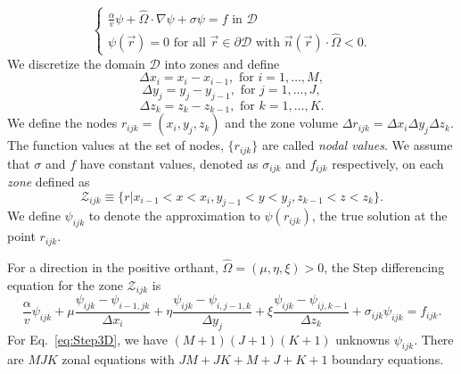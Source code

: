 \begin{equation}
\begin{cases}
	\frac{\alpha}{v} \psi + \hat{\Omega} \cdot \nabla \psi + \sigma \psi = f \text{ in } \mathcal{D} \\
	\psi(\vec{r}) = 0 \text{ for all } \vec{r} \in \partial \mathcal{D} \text { with } \vec{n}(\vec{r}) \cdot \hat{\Omega} < 0.
\end{cases}
\label{eq:ContG}
\end{equation}
We discretize the domain $\mathcal{D}$ into zones and define
\begin{equation}
	\Delta x_{i} = x_{i} - x_{i-1}, \text{ for } i = 1, \dots, M,
\end{equation}
\begin{equation}
	\Delta y_{j} = y_{j} - y_{j-1}, \text{ for } j = 1, \dots, J,
\end{equation}
\begin{equation}
	\Delta z_{k} = z_{k} - z_{k-1}, \text{ for } k = 1, \dots, K.
\end{equation}
We define the nodes $r_{ijk} = (x_{i}, y_{j}, z_{k})$ and the zone volume $\Delta r_{ijk} = \Delta x_{i} \Delta y_{j} \Delta z_{k}$. The function values at the set of nodes, $\{r_{ijk}\}$ are called \textit{nodal values}. We assume that $\sigma$ and $f$ have constant values, denoted as $\sigma_{ijk}$ and $f_{ijk}$ respectively, on each \textit{zone} defined as
\begin{equation}
	\mathcal{Z}_{ijk} \equiv \{ r \vert x_{i-1} < x < x_{i}, y_{j-1} < y < y_{j}, z_{k-1} < z < z_{k} \}.
\end{equation}
We define $\psi_{ijk}$ to denote the approximation to $\psi(r_{ijk})$, the true solution at the point $r_{ijk}$. 

For a direction in the positive orthant, $\hat{\Omega} = (\mu, \eta, \xi) > 0$, the Step differencing equation for the zone $\mathcal{Z}_{ijk}$ is
\begin{equation}
	\frac{\alpha}{v} \psi_{ijk} + \mu \frac{\psi_{ijk} - \psi_{i-1,jk}}{\Delta x_{i}} + \eta \frac{\psi_{ijk} - \psi_{i,j-1,k}}{\Delta y_{j}} + \xi \frac{\psi_{ijk} - \psi_{ij,k-1}}{\Delta z_{k}} + \sigma_{ijk} \psi_{ijk} = f_{ijk}.
	\label{eq:Step3D}
\end{equation}
For Eq.~\ref{eq:Step3D}, we have $(M+1)(J+1)(K+1)$ unknowns $\psi_{ijk}$. There are $MJK$ zonal equations with $JM + JK + M + J + K + 1$ boundary equations.

